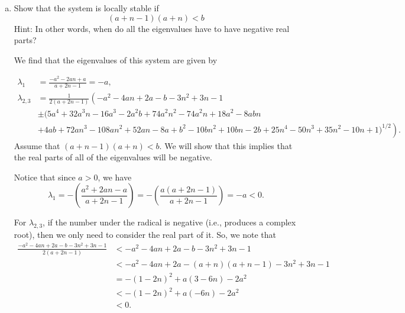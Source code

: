 \documentclass[11pt]{amsart}
\begin{document}
\begin{enumerate}[a)]
 We calculate the Jacobian associated with this system to find that $$ J = \begin{bmatrix} -a-b y & (n-1) n-b x & 0 \\ 0 & -a-2 n+1 & 1 \\ b y & b x-(n-1) n & -a \\ \end{bmatrix}. $$ Then, the second equilibrium point $E_2$, we get that $$ J_{E_2} = \begin{bmatrix} \frac{(n-1) n-b}{a+2 n-1} & -a (a+2 n-1) & 0 \\ 0 & -a-2 n+1 & 1 \\ \frac{b-(a+n-1) (a+n)}{a+2 n-1} & a (a+2 n-1) & -a \\ \end{bmatrix}. $$

\item Show that the system is locally stable if
$$ (a + n - 1) (a + n) < b $$
Hint: In other words, when do all the eigenvalues have to have negative real parts?

 We find that the eigenvalues of this system are given by 

\begin{align*} \lambda_1 &= \frac{-a^2-2 a n+a}{a+2 n-1} = -a, \\ 
\lambda_{2,3} &= \frac{1}{2 (a+2 n-1)} \left( -a^2-4 a n+2 a-b-3 n^2+3 n-1 \right.\\
&\pm(5 a^4+32 a^3 n-16 a^3-2 a^2 b+74 a^2 n^2-74 a^2 n+18 a^2-8 a b n\\ 
&\left. +4 a b+72 a n^3-108 a n^2+52 a n-8 a+b^2-10 b n^2+10 b n-2 b+25 n^4-50 n^3+35 n^2-10 n+1)^{1/2}\right). 
\end{align*}
Assume that $(a+n-1)(a+n)<b$. We will show that this implies that the real parts of all of the eigenvalues will be negative.

Notice that since $a>0$, we have $$ \lambda_1 = - \left( \frac{a^2+2an-a}{a+2n-1} \right) = - \left( \frac{a(a+2n-1)}{a+2n-1} \right) = -a < 0. $$

For $\lambda_{2,3}$, if the number under the radical is negative (i.e., produces a complex root), then we only need to consider the real part of it. So, we note that 
\begin{align*} \frac{-a^2-4 a n+2 a-b-3 n^2+3 n-1}{2(a+2n-1)} &< -a^2-4 a n+2 a-b-3 n^2+3 n-1 \\ 
&< -a^2-4 a n+2 a-(a+n)(a+n-1)-3 n^2+3 n-1 \\ 
&= -(1-2n)^2 + a(3-6n)-2a^2 \\ 
&< -(1-2n)^2 + a(-6n)-2a^2 \\ 
&< 0. \end{align*}


\end{enumerate}
\end{document}
